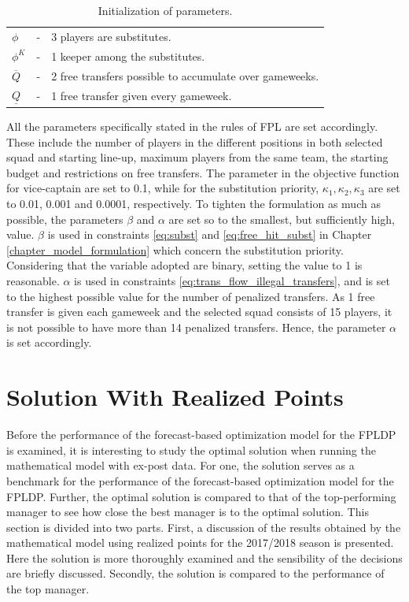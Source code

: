\begin{table}[H]
\begin{tabular}{@{}lll@{}}
$\phi$                           & - & 3 players are substitutes.                                                         \\
$\phi^{K}$                       & - & 1 keeper among the substitutes.                                                          \\
$\overline{Q}$                   & - & 2 free transfers possible to accumulate over gameweeks.                                              \\
$\underline{Q}$                  & - & 1 free transfer given every gameweek.                                      \\ \bottomrule
\end{tabular}
\caption{Initialization of parameters.}
\label{tab:initialization_of_parameters}
\end{table}


All the parameters specifically stated in the rules of FPL are set accordingly. These include the number of players in the different positions in both selected squad and starting line-up, maximum players from the same team, the starting budget and restrictions on free transfers. The parameter in the objective function for vice-captain are set to 0.1, while for the substitution priority, $\kappa_{1}, \kappa_{2}, \kappa_{3}$ are set to 0.01, 0.001 and 0.0001, respectively. To tighten the formulation as much as possible, the parameters $\beta$ and $\alpha$ are set so to the smallest, but sufficiently high, value. $\beta$ is used in constraints \eqref{eq:subst} and \eqref{eq:free_hit_subst} in Chapter \ref{chapter_model_formulation} which concern the substitution priority. Considering that the variable adopted are binary, setting the value to 1 is reasonable. $\alpha$ is used in constraints \eqref{eq:trans_flow_illegal_transfers}, and is set to the highest possible value for the number of penalized transfers. As 1 free transfer is given each gameweek and the selected squad consists of 15 players, it is not possible to have more than 14 penalized transfers. Hence, the parameter $\alpha$ is set accordingly.


\section{Solution With Realized Points}\label{sec:exact}

Before the performance of the forecast-based optimization model for the FPLDP is examined, it is interesting to study the optimal solution when running the mathematical model with ex-post data. For one, the solution serves as a benchmark for the performance of the forecast-based optimization model for the FPLDP. Further, the optimal solution is compared to that of the top-performing manager to see how close the best manager is to the optimal solution. This section is divided into two parts. First, a discussion of the results obtained by the mathematical model using realized points for the 2017/2018 season is presented. Here the solution is more thoroughly examined and the sensibility of the decisions are briefly discussed. Secondly, the solution is compared to the performance of the top manager.
\newpar

